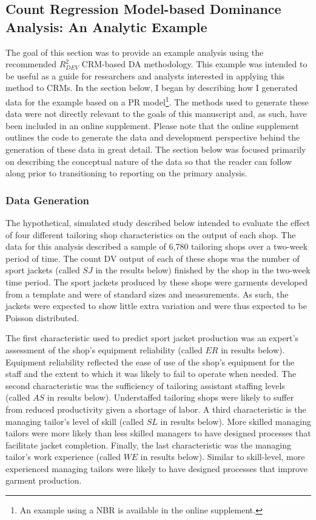 \documentclass[man]{apa7}
\begin{document}
	\subsection{Count Regression Model-based Dominance Analysis: An Analytic Example}
	
	The goal of this section was to provide an example analysis using the recommended $R^2_{DEV}$ CRM-based DA methodology.
	This example was intended to be useful as a guide for researchers and analysts interested in applying this method to CRMs.
	In the section below, I began by describing how I generated data for the example based on a PR model\footnote{
		An example using a NBR is available in the online supplement.}.
	The methods used to generate these data were not directly relevant to the goals of this manuscript and, as such, have been included in an online supplement.
	Please note that the online supplement outlines the code to generate the data and development perspective behind the generation of these data in great detail.
	The section below was focused primarily on describing the conceptual nature of the data so that the reader can follow along prior to transitioning to reporting on the primary analysis.

		\subsubsection{Data Generation}
	
	The hypothetical, simulated study described below intended to evaluate the effect of four different tailoring shop characteristics on the output of each shop.
	The data for this analysis described a sample of 6,780 tailoring shops over a two-week period of time.
	The count DV output of each of these shops was the number of sport jackets (called $SJ$ in the results below) finished by the shop in the two-week time period.
	The sport jackets produced by these shops were garments developed from a template and were of standard sizes and measurements.
	As such, the jackets were expected to show little extra variation and were thus expected to be Poisson distributed.
 
	The first characteristic used to predict sport jacket production was an expert's assessment of the shop's equipment reliability (called $ER$ in results below).
	Equipment reliability reflected the ease of use of the shop's equipment for the staff and the extent to which it was likely to fail to operate when needed. 
	The second characteristic was the sufficiency of tailoring assistant staffing levels (called $AS$ in results below).
	Understaffed tailoring shops were likely to suffer from reduced productivity given a shortage of labor.
	A third characteristic is the managing tailor's level of skill (called $SL$ in results below).
	More skilled managing tailors were more likely than less skilled managers to have designed processes that facilitate jacket completion.
	Finally, the last characteristic was the managing tailor's work experience (called $WE$ in results below).
	Similar to skill-level, more experienced managing tailors were likely to have designed processes that improve garment production.
	
\end{document}
